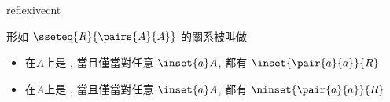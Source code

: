 \begin{modnl}[creators=Jinbo]{reflexive}{cnt}
  \begin{definition}[id=reflexive.def]
  	形如 $\sseteq{R}{\pairs{A}{A}}$ 的關系被叫做
  	\begin{itemize}
  	\item 在$A$上是 , 當且僅當對任意 $\inset{a}A$, 都有 $\inset{\pair{a}{a}}{R}$
  	\item 在$A$上是 , 當且僅當對任意 $\inset{a}A$, 都有 $\ninset{\pair{a}{a}}{R}$ 
  	\end{itemize}
  \end{definition}
\end{modnl}
